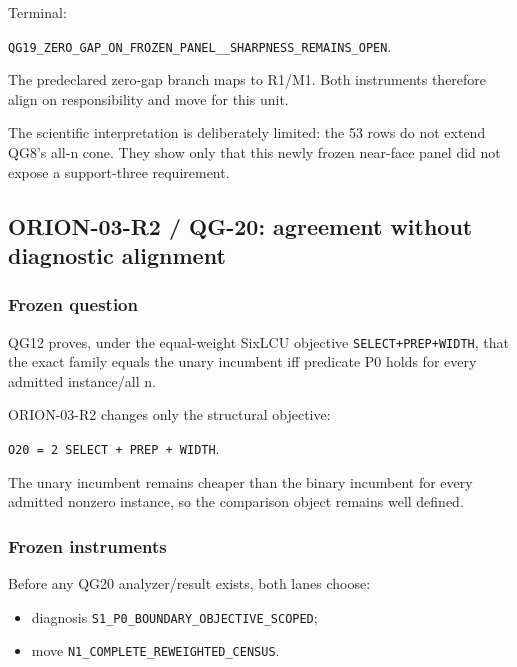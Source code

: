 \documentclass[10pt]{article}
\providecommand{\tightlist}{%
  \setlength{\itemsep}{0pt}\setlength{\parskip}{0pt}}
\begin{document}
Terminal:

\texttt{QG19\_ZERO\_GAP\_ON\_FROZEN\_PANEL\_\_SHARPNESS\_REMAINS\_OPEN}.

The predeclared zero-gap branch maps to R1/M1. Both instruments
therefore align on responsibility and move for this unit.

The scientific interpretation is deliberately limited: the 53 rows do
not extend QG8's all-n cone. They show only that this newly frozen
near-face panel did not expose a support-three requirement.

\hypertarget{orion-03-r2-qg-20-agreement-without-diagnostic-alignment}{%
\subsection{ORION-03-R2 / QG-20: agreement without diagnostic
alignment}\label{orion-03-r2-qg-20-agreement-without-diagnostic-alignment}}

\hypertarget{frozen-question-1}{%
\subsubsection{Frozen question}\label{frozen-question-1}}

QG12 proves, under the equal-weight SixLCU objective
\texttt{SELECT+PREP+WIDTH}, that the exact family equals the unary
incumbent iff predicate P0 holds for every admitted instance/all n.

ORION-03-R2 changes only the structural objective:

\texttt{O20\ =\ 2\ SELECT\ +\ PREP\ +\ WIDTH}.

The unary incumbent remains cheaper than the binary incumbent for every
admitted nonzero instance, so the comparison object remains well
defined.

\hypertarget{frozen-instruments-1}{%
\subsubsection{Frozen instruments}\label{frozen-instruments-1}}

Before any QG20 analyzer/result exists, both lanes choose:

\begin{itemize}
\tightlist
\item
  diagnosis \texttt{S1\_P0\_BOUNDARY\_OBJECTIVE\_SCOPED};
\item
  move \texttt{N1\_COMPLETE\_REWEIGHTED\_CENSUS}.
\end{itemize}
\end{document}
